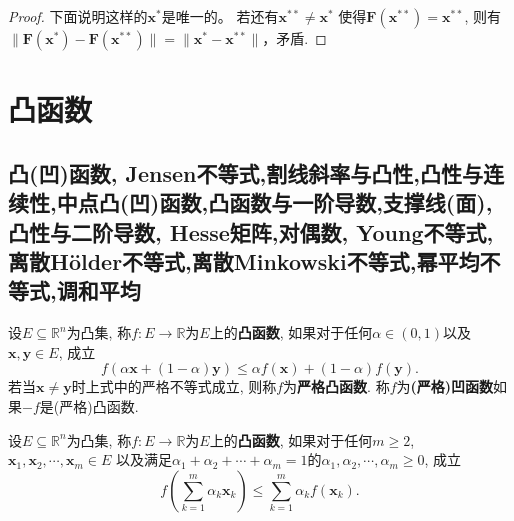 \begin{2b}
\begin{enumerate}
\begin{proof}
下面说明这样的\(\boldsymbol{x^*}\)是唯一的。
若还有\(\boldsymbol{x^{**}}\ne\boldsymbol{x^*}\)
使得\(\boldsymbol{F}(\boldsymbol{x^{**}})=\boldsymbol{x}^{**}\), 
则有\(\|\boldsymbol{F}(\boldsymbol{x^*})-\boldsymbol{F}(\boldsymbol{x^{**}})\|
=\|\boldsymbol{x^*}-\boldsymbol{x^{**}}\|\)，矛盾.
\end{proof}
\end{enumerate}
\end{2b}

\section{凸函数}
\subsection{凸(凹)函数, Jensen不等式,割线斜率与凸性,凸性与连续性,中点凸(凹)函数,凸函数与一阶导数,支撑线(面),凸性与二阶导数, Hesse矩阵,对偶数, Young不等式,离散H\"{o}lder不等式,离散Minkowski不等式,幂平均不等式,调和平均}
\begin{definition}\label{C61}
设\(E\subseteq\mathbb{R}^n\)为凸集, 称\(f:E\rightarrow\mathbb{R}\)为\(E\)上的\textbf{凸函数}, 
如果对于任何\(\alpha\in(0,1)\)以及\(\boldsymbol{x,y}\in E\), 成立
\[f(\alpha\boldsymbol{x}+(1-\alpha)\boldsymbol{y})\leqslant\alpha f(\boldsymbol{x})+(1-\alpha)f(\boldsymbol{y}).\]
若当\(\boldsymbol{x}\ne\boldsymbol{y}\)时上式中的严格不等式成立, 则称\(f\)为\textbf{严格凸函数}. 
称\(f\)为\textbf{(严格)凹函数}如果\(-f\)是(严格)凸函数.
\end{definition}
\begin{definition}\label{C62}
    设\(E\subseteq\mathbb{R}^n\)为凸集, 称\(f:E\rightarrow\mathbb{R}\)为\(E\)上的\textbf{凸函数}, 
    如果对于任何\(m\geqslant 2\), \(\boldsymbol{x}_1,\boldsymbol{x}_2,\cdots,\boldsymbol{x}_m\in E\)
    以及满足\(\alpha_1+\alpha_2+\cdots+\alpha_m=1\)的\(\alpha_1,\alpha_2,\cdots,\alpha_m\geqslant 0\), 成立
    \[f\left(\sum_{k=1}^{m}\alpha_k\boldsymbol{x}_k\right)
    \leqslant\sum_{k=1}^{m}\alpha_kf(\boldsymbol{x}_k).\]
\end{definition}

